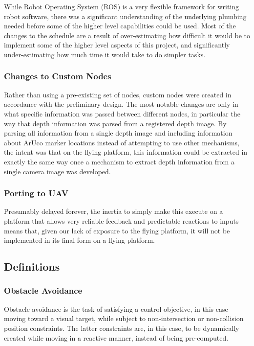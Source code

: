 \documentclass{article}[12]
\begin{document}
	While Robot Operating System (ROS) is a very flexible framework for writing robot software, there was a significant understanding of the underlying plumbing needed before some of the higher level capabilities could be used. Most of the changes to the schedule are a result of over-estimating how difficult it would be to implement some of the higher level aspects of this project, and significantly under-estimating how much time it would take to do simpler tasks.
	
		\subsubsection{Changes to Custom Nodes}
	
	Rather than using a pre-existing set of nodes, custom nodes were created in accordance with the preliminary design. The most notable changes are only in what specific information was passed between different nodes, in particular the way that depth information was parsed from a registered depth image. By parsing all information from a single depth image and including information about ArUco marker locations instead of attempting to use other mechanisms, the intent was that on the flying platform, this information could be extracted in exactly the same way once a mechanism to extract depth information from a single camera image was developed.
	
	\subsubsection{Porting to UAV}
	
	Presumably delayed forever, the inertia to simply make this execute on a platform that allows very reliable feedback and predictable reactions to inputs means that, given our lack of exposure to the flying platform, it will not be implemented in its final form on a flying platform. 

	\subsection{Definitions}
	
		\subsubsection{Obstacle Avoidance}
		
		Obstacle avoidance is the task of satisfying a control objective, in this case moving toward a visual target, while subject to non-intersection or non-collision position constraints. The latter constraints are, in this case, to be dynamically created while moving in a reactive manner, instead of being pre-computed.
		
\end{document}
